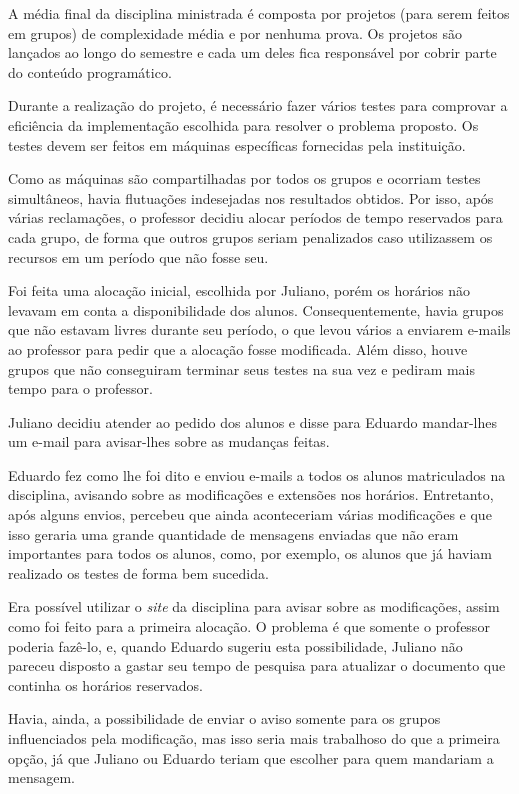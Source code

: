\documentclass[a4paper,dvipdfm]{article}
\begin{document}
    A média final da disciplina ministrada é composta por projetos (para serem feitos em grupos) de complexidade média e por nenhuma prova.
	Os projetos são lançados ao longo do semestre e cada um deles fica responsável por cobrir parte do conteúdo programático.

	Durante a realização do projeto, é necessário fazer vários testes para comprovar a eficiência da implementação escolhida para resolver o problema proposto. 
	Os testes devem ser feitos em máquinas específicas fornecidas pela instituição.
	
	Como as máquinas são compartilhadas por todos os grupos e ocorriam testes simultâneos, havia flutuações indesejadas nos resultados obtidos.
	Por isso, após várias reclamações, o professor decidiu alocar períodos de tempo reservados para cada grupo, de forma que outros grupos seriam penalizados caso utilizassem os recursos em um período que não fosse seu.

	Foi feita uma alocação inicial, escolhida por Juliano, porém os horários não levavam em conta a disponibilidade dos alunos. 
	Consequentemente, havia grupos que não estavam livres durante seu período, o que levou vários a enviarem e-mails ao professor para pedir que a alocação fosse modificada.
	Além disso, houve grupos que não conseguiram terminar seus testes na sua vez e pediram mais tempo para o professor.

	Juliano decidiu atender ao pedido dos alunos e disse para Eduardo mandar-lhes um e-mail para avisar-lhes sobre as mudanças feitas.
	
	Eduardo fez como lhe foi dito e enviou e-mails a todos os alunos matriculados na disciplina, avisando sobre as modificações e extensões nos horários.
	Entretanto, após alguns envios, percebeu que ainda aconteceriam várias modificações e que isso geraria uma grande quantidade de mensagens enviadas que não eram importantes para todos os alunos, como, por exemplo, os alunos que já haviam realizado os testes de forma bem sucedida.

	Era possível utilizar o \emph{site} da disciplina para avisar sobre as modificações, assim como foi feito para a primeira alocação. 
	O problema é que somente o professor poderia fazê-lo, e, quando Eduardo sugeriu esta possibilidade, Juliano não pareceu disposto a gastar seu tempo de pesquisa para atualizar o documento que continha os horários reservados.

	Havia, ainda, a possibilidade de enviar o aviso somente para os grupos influenciados pela modificação, mas isso seria mais trabalhoso do que a primeira opção, já que Juliano ou Eduardo teriam que escolher para quem mandariam a mensagem.
	
\end{document}
